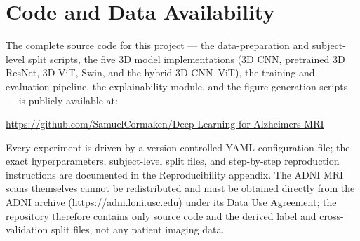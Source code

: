 \documentclass[12pt]{report}
\begin{document}
% 

% 



\chapter*{Code and Data Availability}
The complete source code for this project --- the data-preparation and subject-level split scripts, the five 3D model implementations (3D CNN, pretrained 3D ResNet, 3D ViT, Swin, and the hybrid 3D CNN--ViT), the training and evaluation pipeline, the explainability module, and the figure-generation scripts --- is publicly available at:
\begin{center}
\url{https://github.com/SamuelCormaken/Deep-Learning-for-Alzheimers-MRI}
\end{center}
Every experiment is driven by a version-controlled YAML configuration file; the exact hyperparameters, subject-level split files, and step-by-step reproduction instructions are documented in the Reproducibility appendix. The ADNI MRI scans themselves cannot be redistributed and must be obtained directly from the ADNI archive (\url{https://adni.loni.usc.edu}) under its Data Use Agreement; the repository therefore contains only source code and the derived label and cross-validation split files, not any patient imaging data.






\appendix 
% 

\end{document}
